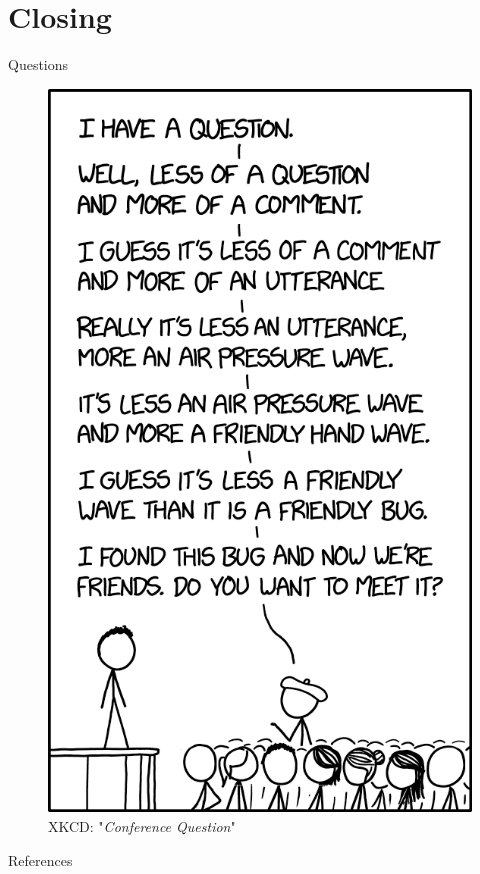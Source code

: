 \documentclass{beamer}
\begin{document}
\section{Closing}

\begin{frame}{Questions}
	\begin{figure}
		\includegraphics[width=.275\textwidth]{../Images/conference_question.png}
		\caption{XKCD: "\textit{Conference Question}" \cite{xkcd-confrence-questions}}
	\end{figure}
\end{frame}

\begin{frame}[allowframebreaks]{References}
\printbibliography
\end{frame}
\end{document}
